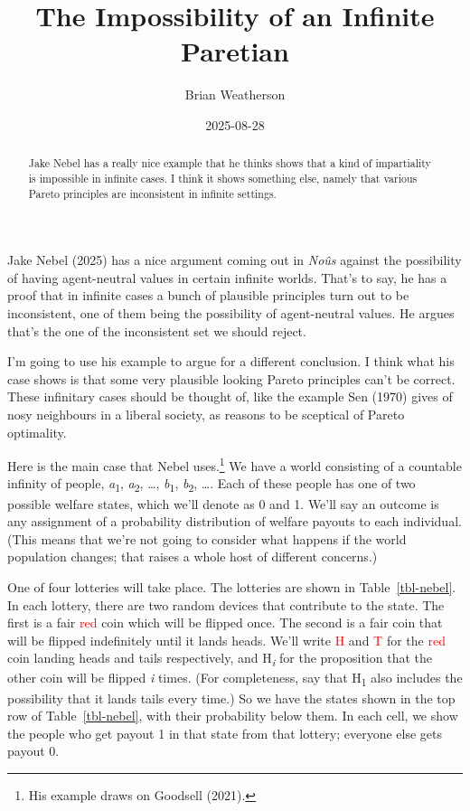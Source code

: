 \documentclass[
  letterpaper,
  DIV=11,
  numbers=noendperiod,
  oneside]{scrartcl}
\title{The Impossibility of an Infinite Paretian}
\author{Brian Weatherson}
\date{2025-08-28}
\begin{document}
\maketitle
\begin{abstract}
Jake Nebel has a really nice example that he thinks shows that a kind of
impartiality is impossible in infinite cases. I think it shows something
else, namely that various Pareto principles are inconsistent in infinite
settings.
\end{abstract}


Jake Nebel (2025) has a nice argument coming out in \emph{Noûs} against
the possibility of having agent-neutral values in certain infinite
worlds. That's to say, he has a proof that in infinite cases a bunch of
plausible principles turn out to be inconsistent, one of them being the
possibility of agent-neutral values. He argues that's the one of the
inconsistent set we should reject.

I'm going to use his example to argue for a different conclusion. I
think what his case shows is that some very plausible looking Pareto
principles can't be correct. These infinitary cases should be thought
of, like the example Sen (1970) gives of nosy neighbours in a liberal
society, as reasons to be sceptical of Pareto optimality.

Here is the main case that Nebel uses.\footnote{His example draws on
  Goodsell (2021).} We have a world consisting of a countable infinity
of people, \emph{a}\textsubscript{1}, \emph{a}\textsubscript{2}, \ldots,
\emph{b}\textsubscript{1}, \emph{b}\textsubscript{2}, \ldots. Each of
these people has one of two possible welfare states, which we'll denote
as 0 and 1. We'll say an outcome is any assignment of a probability
distribution of welfare payouts to each individual. (This means that
we're not going to consider what happens if the world population
changes; that raises a whole host of different concerns.)

One of four lotteries will take place. The lotteries are shown in
Table~\ref{tbl-nebel}. In each lottery, there are two random devices
that contribute to the state. The first is a fair \textcolor{red}{red}
coin which will be flipped once. The second is a fair coin that will be
flipped indefinitely until it lands heads. We'll write
\textcolor{red}{H} and \textcolor{red}{T} for the \textcolor{red}{red}
coin landing heads and tails respectively, and H\textsubscript{\emph{i}}
for the proposition that the other coin will be flipped \emph{i} times.
(For completeness, say that H\textsubscript{1} also includes the
possibility that it lands tails every time.) So we have the states shown
in the top row of Table~\ref{tbl-nebel}, with their probability below
them. In each cell, we show the people who get payout 1 in that state
from that lottery; everyone else gets payout 0.
\end{document}
